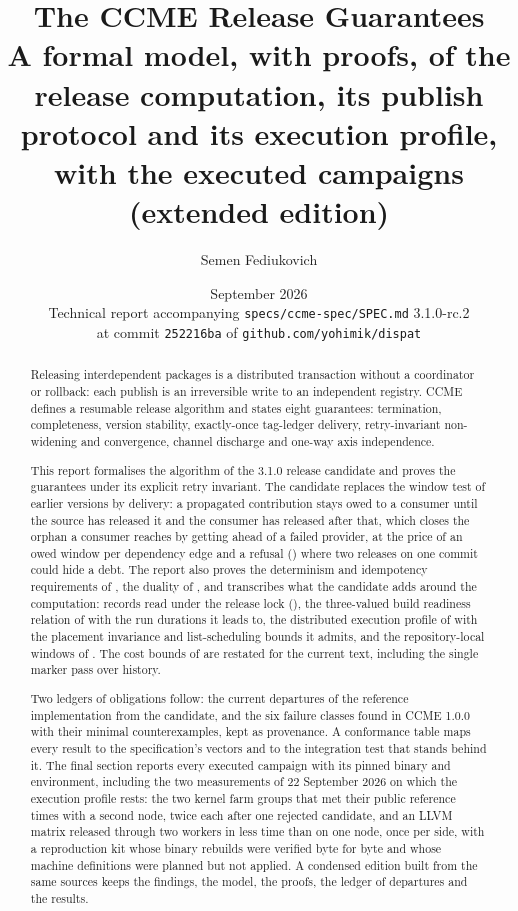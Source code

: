 \documentclass[11pt,a4paper]{article}
\title{The CCME Release Guarantees\\[2mm]
       \large A formal model, with proofs, of the release computation, its publish
       protocol and its execution profile, with the executed campaigns (extended edition)}
\author{Semen Fediukovich}
\date{September 2026 \\[2mm]
      \normalsize Technical report accompanying \texttt{specs/ccme-spec/SPEC.md} 3.1.0-rc.2\\
      \normalsize at commit \texttt{252216ba} of \texttt{github.com/yohimik/dispat}}
\begin{document}
\maketitle

\begin{abstract}
Releasing interdependent packages is a distributed transaction without a
coordinator or rollback: each publish is an irreversible write to an
independent registry. CCME defines a resumable release algorithm and states
eight guarantees: termination, completeness, version stability, exactly-once
tag-ledger delivery, retry-invariant non-widening and convergence, channel
discharge and one-way axis independence.

This report formalises the algorithm of the 3.1.0 release candidate and proves
the guarantees under its explicit retry invariant. The candidate replaces the
window test of earlier versions by delivery: a propagated contribution stays
owed to a consumer until the source has released it and the consumer has
released after that, which closes the orphan a consumer reaches by getting
ahead of a failed provider, at the price of an owed window per dependency edge
and a refusal () where two releases on one commit could hide a debt.
The report also proves the determinism and idempotency requirements of
, the duality of , and transcribes what the candidate
adds around the computation: records read under the release lock
(), the three-valued build readiness relation of  with
the run durations it leads to, the distributed execution profile of 
with the placement invariance and list-scheduling bounds it admits, and the
repository-local windows of . The cost bounds of 
are restated for the current text, including the single marker pass over
history.

Two ledgers of obligations follow: the current departures of the reference
implementation from the candidate, and the six failure classes found in
CCME 1.0.0 with their minimal counterexamples, kept as provenance. A
conformance table maps every result to the specification's vectors and to the
integration test that stands behind it. The final section reports every
executed campaign with its pinned binary and environment, including the two
measurements of 22 September 2026 on which the execution profile rests: the
two kernel farm groups that met their public reference times with a second
node, twice each after one rejected candidate, and an LLVM matrix released
through two workers in less time than on one node, once per side, with a
reproduction kit whose binary rebuilds were verified byte for byte and whose
machine definitions were planned but not applied. A condensed edition built
from the same sources keeps the findings, the model, the proofs, the ledger
of departures and the results.
\end{abstract}
\end{document}
